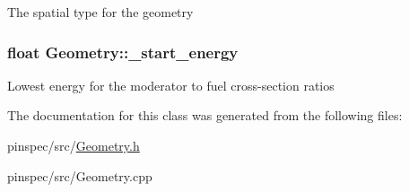 The spatial type for the geometry \hypertarget{classGeometry_a274a1e1973986b23507d7c11fb30ea76}{
\subsubsection[{\-\_\-start\-\_\-energy}]{\setlength{\rightskip}{0pt plus 5cm}float Geometry\-::\-\_\-start\-\_\-energy\hspace{0.3cm}{\ttfamily [private]}}}\label{classGeometry_a274a1e1973986b23507d7c11fb30ea76}
Lowest energy for the moderator to fuel cross-\/section ratios 

The documentation for this class was generated from the following files\-:\begin{DoxyCompactItemize}
\item 
pinspec/src/\hyperlink{Geometry_8h}{Geometry.\-h}\item 
pinspec/src/Geometry.\-cpp\end{DoxyCompactItemize}
